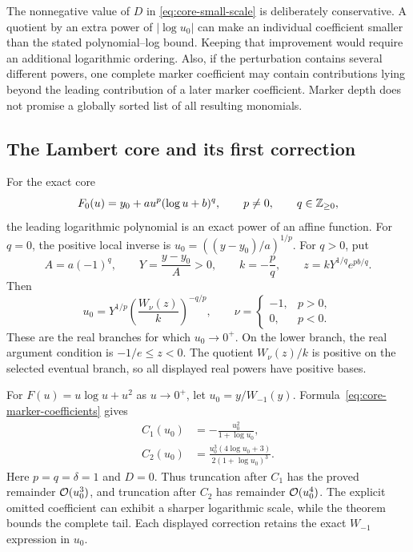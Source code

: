 The nonnegative value of $D$ in \eqref{eq:core-small-scale} is deliberately
conservative. A quotient by an extra power of $|\log u_0|$ can make an
individual coefficient smaller than the stated polynomial--log bound.
Keeping that improvement would require an additional logarithmic ordering. Also, if the perturbation contains several different powers,
one complete marker coefficient may contain contributions lying beyond
the leading contribution of a later marker coefficient. Marker depth does
not promise a globally sorted list of all resulting monomials.

\subsection{The Lambert core and its first correction}

For the exact core
\[
 F_0(u)=y_0+a u^p(\log u+b)^q,\qquad p\ne0,
 \qquad q\in\mathbb Z_{\ge0},
\]
the leading logarithmic polynomial is an exact power of an affine function. For $q=0$, the positive local inverse is
$u_0=((y-y_0)/a)^{1/p}$. For $q>0$, put
\[
 A=a(-1)^q,\qquad Y=\frac{y-y_0}{A}>0,\qquad
 k=-\frac pq,\qquad z=kY^{1/q}e^{pb/q}.
\]
Then
\begin{equation}
 u_0=Y^{1/p}\left(\frac{W_\nu(z)}{k}\right)^{-q/p},
 \qquad
 \nu=\begin{cases}-1,&p>0,\\0,&p<0.\end{cases}
 \label{eq:core-exact-lambert-inverse}
\end{equation}
These are the real branches for which $u_0\to0^+$. On the lower branch,
the real argument condition is $-1/e\le z<0$. The
quotient $W_\nu(z)/k$ is positive on the selected eventual branch, so all
displayed real powers have positive bases.

\begin{example}
\label{ex:core-lambert-quadratic-perturbation}
For $F(u)=u\log u+u^2$ as $u\to0^+$, let
$u_0=y/W_{-1}(y)$. Formula~\eqref{eq:core-marker-coefficients} gives
\begin{align}
 C_1(u_0)&=-\frac{u_0^2}{1+\log u_0},\label{eq:core-lambert-first-correction}\\
 C_2(u_0)&=\frac{u_0^3(4\log u_0+3)}{2(1+\log u_0)^3}.
 \label{eq:core-lambert-second-correction}
\end{align}
Here $p=q=\delta=1$ and $D=0$. Thus truncation after $C_1$ has the
proved remainder $\mathcal O(u_0^3)$, and truncation after $C_2$ has remainder
$\mathcal O(u_0^4)$. The explicit omitted coefficient can exhibit a sharper
logarithmic scale, while the theorem bounds the complete tail. Each displayed correction retains the exact
$W_{-1}$ expression in $u_0$.
\end{example}

